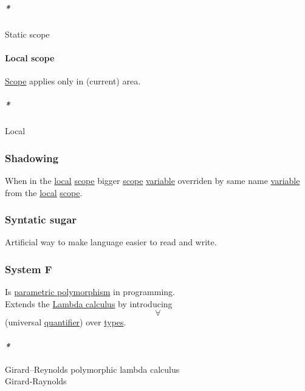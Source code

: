 \documentclass[11pt]{article}
\begin{document}
\subparagraph{\emph{*}}
\label{sec:orge6385b7}

\label{org3990e81}Static scope\\

\paragraph{\label{orgaad4c34}Local scope}
\label{sec:org5c3a2cf}
\hyperref[orga4eed83]{Scope} applies only in (current) area.\\

\subparagraph{\emph{*}}
\label{sec:orga8f4944}

\label{org37376b3}Local\\

\subsubsection{\label{orgb2a7148}Shadowing}
\label{sec:org5531290}
When in the \hyperref[org37376b3]{local} \hyperref[orga4eed83]{scope} bigger \hyperref[orga4eed83]{scope} \hyperref[org301bab5]{variable} overriden by same name \hyperref[org301bab5]{variable} from the \hyperref[org37376b3]{local} \hyperref[orga4eed83]{scope}.\\

\subsubsection{\label{orgca01751}Syntatic sugar}
\label{sec:orgb54fbc8}
Artificial way to make language easier to read and write.\\

\subsubsection{\label{org5c18adb}System F}
\label{sec:org690e9a1}
Is \hyperref[org9b7bee7]{parametric polymorphism} in programming.\\

Extends the \hyperref[org617da6f]{Lambda calculus} by introducing $$ \forall $$ (universal \hyperref[org7158dde]{quantifier}) over \hyperref[org3927fd9]{types}.\\

\paragraph{\emph{*}}
\label{sec:orga876e8a}

\label{org3159bd7}Girard–Reynolds polymorphic lambda calculus\\
\label{org4425565}Girard-Raynolds\\
\end{document}

